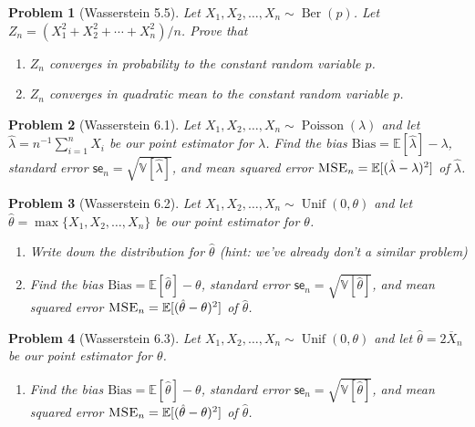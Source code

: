 \documentclass{article}
\newtheorem{problem}{Problem}
\newcommand{\EE}{\mathbb{E}}
\newcommand{\VV}{\mathbb{V}}
\begin{document}
\begin{problem}[Wasserstein 5.5]
    Let $X_1, X_2, \ldots, X_n \sim \operatorname{Ber}(p)$. 
    Let $Z_n = (X_1^2 + X_2^2 + \cdots + X_n^2) / n$.
    Prove that
    \begin{enumerate}[label=(\alph*),topsep=0pt]
        \item $Z_n$ converges in probability to the constant random variable $p$.
        \item $Z_n$ converges in quadratic mean to the constant random variable $p$.
    \end{enumerate}
\end{problem}

\begin{problem}[Wasserstein 6.1]
    Let $X_1, X_2, \ldots, X_n \sim \operatorname{Poisson}(\lambda)$ and let $\hat{\lambda} = n^{-1} \sum_{i=1}^{n} X_i$ be our point estimator for $\lambda$.
    Find the bias $\mathrm{Bias} = \EE[\hat{\lambda}] - \lambda$, standard error $\textsf{se}_n = \sqrt{\VV[\hat{\lambda}]}$, and mean squared error $\textsc{MSE}_n = \EE[(\hat{\lambda} - \lambda)^2]$ of $\hat{\lambda}$.
\end{problem}

\begin{problem}[Wasserstein 6.2]
    Let $X_1, X_2, \ldots, X_n \sim \operatorname{Unif}(0,\theta)$ and let $\hat{\theta} = \max\{X_1, X_2, \ldots, X_n\}$ be our point estimator for $\theta$.

    \begin{enumerate}[label=(\alph*),topsep=0pt]
        \item Write down the distribution for $\hat{\theta}$ (hint: we've already don't a similar problem)
        \item Find the bias $\mathrm{Bias} = \EE[\hat{\theta}] - \theta$, standard error $\textsf{se}_n = \sqrt{\VV[\hat{\theta}]}$, and mean squared error $\textsc{MSE}_n = \EE[(\hat{\theta} - \theta)^2]$ of $\hat{\theta}$.
    \end{enumerate}
\end{problem}

\begin{problem}[Wasserstein 6.3]
    Let $X_1, X_2, \ldots, X_n \sim \operatorname{Unif}(0,\theta)$ and let $\hat{\theta} = 2 \overline{X}_n$ be our point estimator for $\theta$.

    \begin{enumerate}[label=(\alph*),topsep=0pt]
        \item Find the bias $\mathrm{Bias} = \EE[\hat{\theta}] - \theta$, standard error $\textsf{se}_n = \sqrt{\VV[\hat{\theta}]}$, and mean squared error $\textsc{MSE}_n = \EE[(\hat{\theta} - \theta)^2]$ of $\hat{\theta}$.
    \end{enumerate}
\end{problem}
\end{document}

